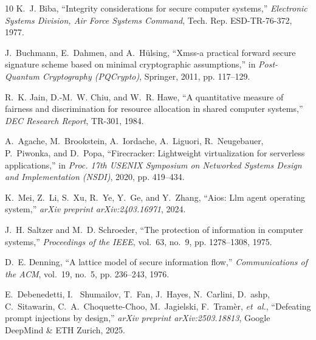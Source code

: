 \documentclass[10pt,journal,compsoc]{IEEEtran}
\theoremstyle{definition}
\begin{document}
\begin{thebibliography}{10}
K.~J. Biba,
  ``Integrity considerations for secure computer systems,''
  \emph{Electronic Systems Division, Air Force Systems Command}, Tech. Rep. ESD-TR-76-372, 1977.

J.~Buchmann, E.~Dahmen, and A.~H{\"u}lsing,
  ``Xmss-a practical forward secure signature scheme based on minimal cryptographic assumptions,''
  in \emph{Post-Quantum Cryptography (PQCrypto)}, Springer, 2011, pp. 117--129.

R.~K. Jain, D.-M.~W. Chiu, and W.~R. Hawe,
  ``A quantitative measure of fairness and discrimination for resource allocation in shared computer systems,''
  \emph{DEC Research Report}, TR-301, 1984.

A.~Agache, M.~Brookstein, A.~Iordache, A.~Liguori, R.~Neugebauer, P.~Piwonka, and D.~Popa,
  ``Firecracker: Lightweight virtualization for serverless applications,''
  in \emph{Proc. 17th USENIX Symposium on Networked Systems Design and Implementation (NSDI)}, 2020, pp. 419--434.

K.~Mei, Z.~Li, S.~Xu, R.~Ye, Y.~Ge, and Y.~Zhang,
  ``Aios: Llm agent operating system,''
  \emph{arXiv preprint arXiv:2403.16971}, 2024.

J.~H. Saltzer and M.~D. Schroeder,
  ``The protection of information in computer systems,''
  \emph{Proceedings of the IEEE}, vol.~63, no.~9, pp. 1278--1308, 1975.

D.~E. Denning,
  ``A lattice model of secure information flow,''
  \emph{Communications of the ACM}, vol.~19, no.~5, pp. 236--243, 1976.

E.~Debenedetti, I.~ Shumailov, T.~Fan, J.~Hayes, N.~Carlini, D.~ashp, C.~Sitawarin, C.~A.~Choquette-Choo, M.~Jagielski, F.~Tram{\`e}r, \emph{et~al.},
  ``Defeating prompt injections by design,''
  \emph{arXiv preprint arXiv:2503.18813}, Google DeepMind \& ETH Zurich, 2025.

\end{thebibliography}
\end{document}
